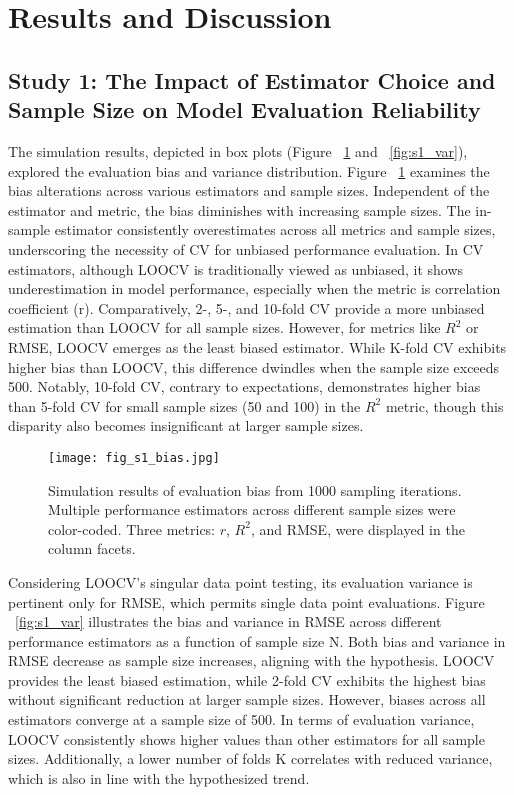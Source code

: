 \section{Results and Discussion}

\subsection{Study 1: The Impact of Estimator Choice and Sample Size on Model Evaluation Reliability}

The simulation results, depicted in box plots (Figure ~\ref{fig:s1_bias} and ~\ref{fig:s1_var}), explored the evaluation bias and variance distribution. Figure ~\ref{fig:s1_bias} examines the bias alterations across various estimators and sample sizes. Independent of the estimator and metric, the bias diminishes with increasing sample sizes. The in-sample estimator consistently overestimates across all metrics and sample sizes, underscoring the necessity of CV for unbiased performance evaluation. In CV estimators, although LOOCV is traditionally viewed as unbiased, it shows underestimation in model performance, especially when the metric is correlation coefficient (r). Comparatively, 2-, 5-, and 10-fold CV provide a more unbiased estimation than LOOCV for all sample sizes. However, for metrics like $R^2$ or RMSE, LOOCV emerges as the least biased estimator. While K-fold CV exhibits higher bias than LOOCV, this difference dwindles when the sample size exceeds 500. Notably, 10-fold CV, contrary to expectations, demonstrates higher bias than 5-fold CV for small sample sizes (50 and 100) in the $R^2$ metric, though this disparity also becomes insignificant at larger sample sizes.

\begin{figure}[h]
    \centering
    \texttt{[image: fig\_s1\_bias.jpg]}
    \caption{Simulation results of evaluation bias from 1000 sampling iterations. Multiple performance estimators across different sample sizes were color-coded. Three metrics: $r$, $R^2$, and RMSE, were displayed in the column facets.}
    \label{fig:s1_bias}
\end{figure}

Considering LOOCV’s singular data point testing, its evaluation variance is pertinent only for RMSE, which permits single data point evaluations. Figure ~\ref{fig:s1_var} illustrates the bias and variance in RMSE across different performance estimators as a function of sample size N. Both bias and variance in RMSE decrease as sample size increases, aligning with the hypothesis. LOOCV provides the least biased estimation, while 2-fold CV exhibits the highest bias without significant reduction at larger sample sizes. However, biases across all estimators converge at a sample size of 500. In terms of evaluation variance, LOOCV consistently shows higher values than other estimators for all sample sizes. Additionally, a lower number of folds K correlates with reduced variance, which is also in line with the hypothesized trend.

